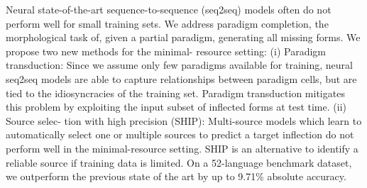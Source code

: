 Neural state-of-the-art sequence-to-sequence (seq2seq) models often do not perform well for small training sets. We address paradigm completion, the morphological task of, given a partial paradigm, generating all missing forms. We propose two new methods for the minimal- resource setting: (i) Paradigm transduction: Since we assume only few paradigms available for training, neural seq2seq models are able to capture relationships between paradigm cells, but are tied to the idiosyncracies of the training set. Paradigm transduction mitigates this problem by exploiting the input subset of inflected forms at test time. (ii) Source selec- tion with high precision (SHIP): Multi-source models which learn to automatically select one or multiple sources to predict a target inflection do not perform well in the minimal-resource setting. SHIP is an alternative to identify a reliable source if training data is limited. On a 52-language benchmark dataset, we outperform the previous state of the art by up to 9.71\% absolute accuracy.
